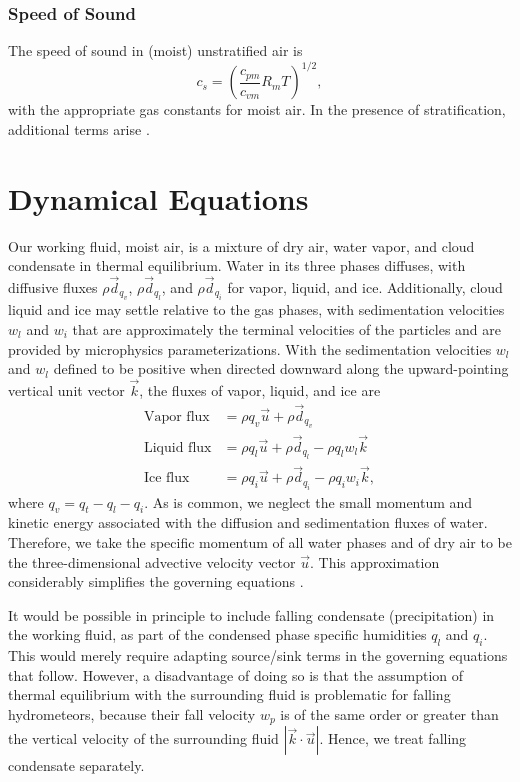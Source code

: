 \documentclass{report}
\begin{document}
\subsection{Speed of Sound} The speed of sound in (moist) unstratified air is 
\begin{equation}\label{e:soundspeed}
 c_s = \left(\frac{c_{pm}}{c_{vm}} R_m T \right)^{1/2}, 
\end{equation}
with the appropriate gas constants for moist air. In the presence of stratification, additional terms arise \citep{Durran99}.

\chapter{Dynamical Equations}
\label{sec:governing_equations}

Our working fluid, moist air, is a mixture of dry air, water vapor, and cloud condensate in thermal equilibrium. Water in its three phases diffuses, with diffusive fluxes $\rho \vec{d}_{q_v}$, $\rho \vec{d}_{q_l}$, and $\rho \vec{d}_{q_i}$ for vapor, liquid, and ice. Additionally, cloud liquid and ice may settle relative to the gas phases, with sedimentation velocities $w_l$ and $w_i$ that are approximately the terminal velocities of the particles and are provided by microphysics parameterizations. With the sedimentation velocities $w_l$ and $w_l$ defined to be positive when directed downward along the upward-pointing vertical unit vector $\vec{k}$, the fluxes of vapor, liquid, and ice are
\begin{subequations}
\begin{align}
    \text{Vapor flux}  &= \rho q_v \vec{u}  + \rho \vec{d}_{q_v}\\
    \text{Liquid flux}  &= \rho q_l \vec{u}  + \rho \vec{d}_{q_l} - \rho q_l w_l  \vec{k}\\
    \text{Ice flux} &= \rho q_i \vec{u} + \rho \vec{d}_{q_i} - \rho q_i w_i  \vec{k},
\end{align}
\end{subequations}
where $q_v = q_t - q_l - q_i$. As is common, we neglect the small momentum and kinetic energy associated with the diffusion and sedimentation fluxes of water. Therefore, we take the specific momentum of all water phases and of dry air to be the three-dimensional advective velocity vector $\vec{u}$. This approximation considerably simplifies the governing equations \citep{Romps08a}.

It would be possible in principle to include falling condensate (precipitation) in the working fluid, as part of the condensed phase specific humidities $q_l$ and $q_i$. This would merely require adapting source/sink terms in the governing equations that follow. However, a disadvantage of doing so is that the assumption of thermal equilibrium with the surrounding fluid is problematic for falling hydrometeors, because their fall velocity $w_{p}$ is of the same order or greater than the vertical velocity of the surrounding fluid $|\vec{k} \cdot \vec{u}|$. Hence, we treat falling condensate separately.
\end{document}
